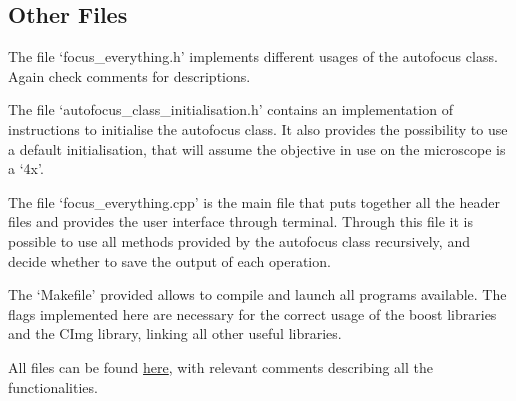 \documentclass[a4paper]{article}
\begin{document}
	\subsection*{Other Files}
	
			The file `focus\_everything.h' implements different usages of the autofocus class.
			Again check comments for descriptions.
			
			The file `autofocus\_class\_initialisation.h' contains an implementation of instructions to initialise the autofocus class.
			It also provides the possibility to use a default initialisation, that will assume the objective in use on the microscope is a `4x'.
			
			The file `focus\_everything.cpp' is the main file that puts together all the header files and provides the user interface through terminal.
			Through this file it is possible to use all methods provided by the autofocus class recursively, and decide whether to save the output of each operation.
			
			The `Makefile' provided allows to compile and launch all programs available.
			The flags implemented here are necessary for the correct usage of the boost libraries and the CImg library, linking all other useful libraries.
			
			All files can be found \href{https://github.com/OpenLabTools/Microscope/tree/master/Raspberry\%20Pi}{here}, with relevant comments describing all the functionalities.
			
			
		
		
		
		
		
		
\end{document}
